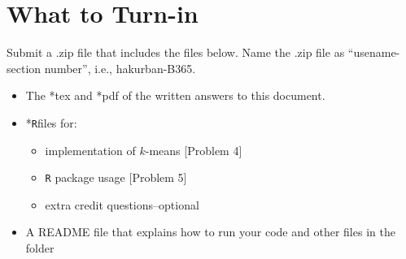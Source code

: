 \documentclass{article}
\newcommand{\quotes}[1]{``#1''}
\begin{document}
\pagebreak


\pagebreak
\section*{What to Turn-in}
 Submit a .zip file that includes the files below. Name the .zip  file as \quotes{usename-section number}, i.e., hakurban-B365.





\begin{itemize}
\item The *tex and *pdf of the written answers to this document.
\item *\texttt{R}files for:
\begin{itemize}
\item  implementation of $k$-means  [Problem 4] 
\item \texttt{R}  package  usage [Problem 5]
\item  extra  credit questions--optional
\end{itemize}
\item A README file that explains how to run your code and other files in the folder
\end{itemize}


 
\end{document}
